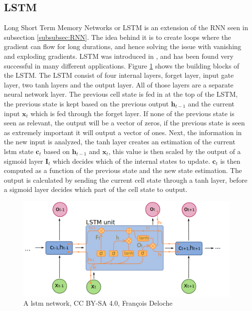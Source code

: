     \subsection{LSTM}
        Long Short Term Memory Networks or LSTM is an extension of the RNN seen in subsection \ref{subsubsec:RNN}. The idea behind it is to create loops where the gradient can flow for long durations, and hence solving the issue with vanishing and exploding gradients. LSTM was introduced in \cite{Hochreiter1997}, and has been found very successful in many different applications. Figure  \ref{fig:lstm} shows the building blocks of the LSTM. The LSTM consist of four internal layers, forget layer, input gate layer, two tanh layers and the output layer. All of those layers are a separate neural network layer. The previous cell state is fed in at the top of the LSTM, the previous state is kept based on the previous output $\bm h_{t-1}$ and the current input $\bm x_t$ which is fed through the forget layer. If none of the previous state is seen as relevant, the output will be a vector of zeros, if the previous state is seen as extremely important it will output a vector of ones. Next, the information in the new input is analyzed, the tanh layer creates an estimation of the current lstm state $\bm c_t$ based on $\bm h_{t-1}$ and $\bm x_t$, this value  is then scaled by the output of a sigmoid layer $\bm I_t$ which decides which of the internal states to update. $\bm c_t$ is then computed as a function of the previous state and the new state estimation. The output is calculated by sending the current cell state through a tanh layer, before a sigmoid layer decides which part of the cell state to output.  
        
        \begin{figure}
            \centering
            \includegraphics[width = \textwidth]{report/figures/techniques/lstm.png}
            \caption{A lstm network, CC BY-SA 4.0, François Deloche} %
            \label{fig:lstm}
        \end{figure}
        
